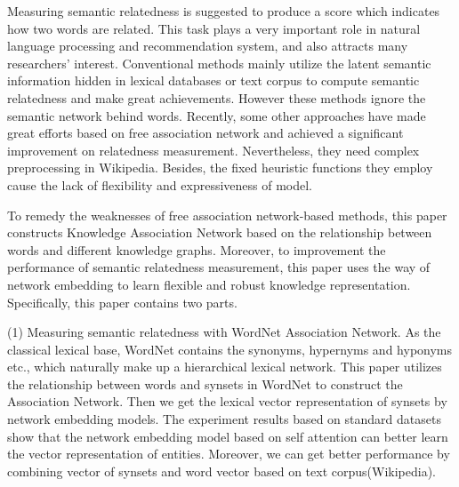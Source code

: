 \begin{englishabstract}


    Measuring semantic relatedness is suggested to produce a score which indicates how two words are related. This task plays a very important role in natural language processing and recommendation system, and also attracts many researchers' interest. Conventional methods mainly utilize the latent semantic information hidden in lexical databases or text corpus to compute semantic relatedness and make great achievements. However these methods ignore the semantic network behind words. Recently, some other approaches have made great efforts based on free association network and achieved a significant improvement on relatedness measurement. Nevertheless, they need complex preprocessing in Wikipedia. Besides, the fixed heuristic functions they employ cause the lack of flexibility and expressiveness of model. 

    To remedy the weaknesses of free association network-based methods, this paper constructs Knowledge Association Network based on the relationship between words and different knowledge graphs. Moreover, to improvement the performance of semantic relatedness measurement, this paper uses the way of network embedding to learn flexible and robust knowledge representation. Specifically, this paper contains two parts.
  
    (1) Measuring semantic relatedness with WordNet Association Network. As the classical lexical base, WordNet contains the synonyms, hypernyms and hyponyms etc., which naturally make up a hierarchical lexical network. This paper utilizes the relationship between words and synsets in WordNet to construct the Association Network. Then we get the lexical vector representation of synsets by network embedding models. The experiment results based on standard datasets show that the network embedding model based on self attention can better learn the vector representation of entities. Moreover, we can get better performance by combining vector of synsets and word vector based on text corpus(Wikipedia).
  

\end{englishabstract}
